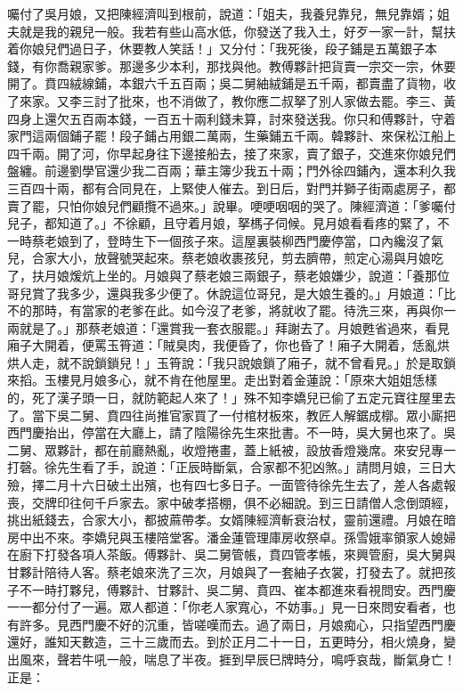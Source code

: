 囑付了吳月娘，又把陳經濟叫到根前，說道：「姐夫，我養兒靠兒，無兒靠婿；姐夫就是我的親兒一般。我若有些山高水低，你發送了我入土，好歹一家一計，幫扶着你娘兒們過日子，休要教人笑話！」又分付：「我死後，段子鋪是五萬銀子本錢，有你喬親家爹。那邊多少本利，那找與他。教傅夥計把貨賣一宗交一宗，休要開了。賁四絨線鋪，本銀六千五百兩；吳二舅紬絨鋪是五千兩，都賣盡了貨物，收了來家。又李三討了批來，也不消做了，教你應二叔拏了別人家做去罷。李三、黃四身上還欠五百兩本錢，一百五十兩利錢未算，討來發送我。你只和傅夥計，守着家門這兩個鋪子罷！段子鋪占用銀二萬兩，生藥鋪五千兩。韓夥計、來保松江船上四千兩。開了河，你早起身往下邊接船去，接了來家，賣了銀子，交進來你娘兒們盤纏。前邊劉學官還少我二百兩；華主簿少我五十兩；門外徐四鋪內，還本利久我三百四十兩，都有合同見在，上緊使人催去。到日后，對門并獅子街兩處房子，都賣了罷，只怕你娘兒們顧攬不過來。」說畢。哽哽咽咽的哭了。陳經濟道：「爹囑付兒子，都知道了。」不徐顧，且守着月娘，拏榪子伺候。見月娘看看疼的緊了，不一時蔡老娘到了，登時生下一個孩子來。這屋裏裝柳西門慶停當，口內纔沒了氣兒，合家大小，放聲號哭起來。蔡老娘收裹孩兒，剪去臍帶，煎定心湯與月娘吃了，扶月娘煖炕上坐的。月娘與了蔡老娘三兩銀子，蔡老娘嫌少，說道：「養那位哥兒賞了我多少，還與我多少便了。休說這位哥兒，是大娘生養的。」月娘道：「比不的那時，有當家的老爹在此。如今沒了老爹，將就收了罷。待洗三來，再與你一兩就是了。」那蔡老娘道：「還賞我一套衣服罷。」拜謝去了。月娘甦省過來，看見廂子大開着，便罵玉筲道：「賊臭肉，我便昏了，你也昏了！廂子大開着，恁亂烘烘人走，就不說鎖鎖兒！」玉筲說：「我只說娘鎖了廂子，就不曾看見。」於是取鎖來搯。玉樓見月娘多心，就不肯在他屋里。走出對着金蓮說：「原來大姐姐恁樣的，死了漢子頭一日，就防範起人來了！」殊不知李嬌兒已偷了五定元寶往屋里去了。當下吳二舅、賁四往尚推官家買了一付棺材板來，教匠人解鋸成槨。眾小廝把西門慶抬出，停當在大廳上，請了陰陽徐先生來批書。不一時，吳大舅也來了。吳二舅、眾夥計，都在前廳熱亂，收燈捲畫，蓋上紙被，設放香燈幾席。來安兒專一打磬。徐先生看了手，說道：「正辰時斷氣，合家都不犯凶煞。」請問月娘，三日大殮，擇二月十六日破土出殯，也有四七多日子。一面管待徐先生去了，差人各處報喪，交牌印往何千戶家去。家中破孝搭棚，俱不必細說。到三日請僧人念倒頭經，挑出紙錢去，合家大小，都披蔴帶孝。女婿陳經濟斬衰治杖，靈前還禮。月娘在暗房中出不來。李嬌兒與玉樓陪堂客。潘金蓮管理庫房收祭卓。孫雪娥率領家人媳婦在廚下打發各項人茶飯。傅夥計、吳二舅管帳，賁四管孝帳，來興管廚，吳大舅與甘夥計陪待人客。蔡老娘來洗了三次，月娘與了一套紬子衣裳，打發去了。就把孩子不一時打夥兒，傅夥計、甘夥計、吳二舅、賁四、崔本都進來看視問安。西門慶一一都分付了一遍。眾人都道：「你老人家寬心，不妨事。」見一日來問安看者，也有許多。見西門慶不好的沉重，皆嗟嘆而去。過了兩日，月娘痴心，只指望西門慶還好，誰知天數造，三十三歲而去。到於正月二十一日，五更時分，相火燒身，變出風來，聲若牛吼一般，喘息了半夜。捱到早辰巳牌時分，鳴呼哀哉，斷氣身亡！正是：

